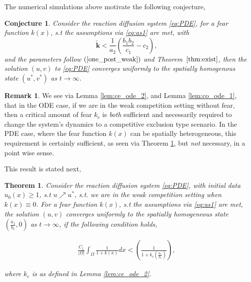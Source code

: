 \documentclass[10pt]{amsart}
\newtheorem{theorem}{Theorem}[section]
\newtheorem{lemma}[theorem]{Lemma}
\newtheorem{conjecture}{Conjecture}
\theoremstyle{definition}
\newtheorem{remark}{Remark}
\begin{document}
The numerical simulations above motivate the following conjecture,
\begin{conjecture}\label{conj:co_1_pde3}
	Consider the reaction diffusion system \eqref{eq:PDE}, for a fear function $k(x)$, s.t the assumptions via \eqref{eq:as1} are met, with 
	\[ \mathbf{\widetilde{k}} < \frac{1}{a_{2}} \left(\frac{b_{1}b_{2}}{c_{1}} - c_{2}\right),\]
	and the parameters follow $(\ref{one_post_weak})$ and Theorem~$\ref{thm:exist}$, then the solution $(u,v)$ to \eqref{eq:PDE}  converges uniformly to the spatially homogenous state $(u^*,v^{*})$ as $t \to \infty$.

\end{conjecture}

\begin{remark}
We see via Lemma \ref{lem:ce_ode_2}, and Lemma \ref{lem:co_ode_1}, that in the ODE case, if we are in the weak competition setting without fear, then a critical amount of fear $k_{c}$ is \emph{both} sufficient and necessarily required to change the system's dynamics to a competitive exclusion type scenario. In the PDE case, where the fear function $k(x)$ can be spatially heterogeneous, this requirement is certainly sufficient, as seen via Theorem \ref{thm:cotoce_1_pde}, but \emph{not} necessary, in a point wise sense. 
\end{remark}

This result is stated next,





\begin{theorem}\label{thm:cotoce_1_pde}
	Consider the reaction diffusion system \eqref{eq:PDE}, with initial data $u_{0}(x) \geq 1$, s.t $u \nearrow u^{*}$, s.t. we are in the weak competition setting when $k(x) \equiv 0$. For a fear function $k(x)$, s.t the assumptions via \eqref{eq:as1} are met, the solution $(u,v) $ converges uniformly to the spatially homogeneous state $(\frac{a_{1}}{b_{1}},0)$ as $t \to \infty$, if the following condition holds,
	
	\begin{align}\label{eq:com1}
	\frac{C_{1}}{|\Omega|}\int_{\Omega} \frac{1}{1+k(x)} dx  <  \left(\frac{1}{1+k_{c} \left(\frac{a_{1}}{b_{1}}\right)} \right),
\end{align}
	
	where $k_{c}$ is as defined in Lemma \ref{lem:ce_ode_2}.
\end{theorem}
\end{document}
